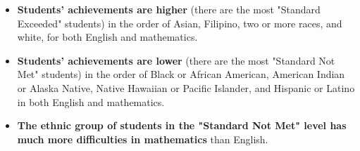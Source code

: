 \documentclass[11pt]{article}
\begin{document}
\begin{itemize}
	\item \textbf{Students' achievements are higher} (there are the most "Standard Exceeded" students) in the order of Asian, Filipino, two or more races, and white, for both English and mathematics.
\item \textbf{Students' achievements are lower} (there are the most "Standard Not Met" students) in the order of Black or African American, American Indian or Alaska Native, Native Hawaiian or Pacific Islander, and Hispanic or Latino in both English and mathematics.
\item \textbf{The ethnic group of students in the "Standard Not Met" level has much more difficulties in mathematics} than English. 
\end{itemize}
  
\end{document}
